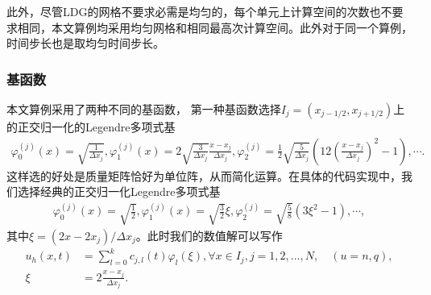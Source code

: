 此外，尽管LDG的网格不要求必需是均匀的，每个单元上计算空间的次数也不要求相同，本文算例均采用均匀网格和相同最高次计算空间。此外对于同一个算例，时间步长也是取均匀时间步长。
\subsubsection{基函数}
本文算例采用了两种不同的基函数，
第一种基函数选择$I_j = (x_{j-1/2}, x_{j+1/2})$上的正交归一化的Legendre多项式基
\begin{align*}
	\varphi_0^{(j)}(x) = \sqrt{\frac{1}{\Delta x_j}}, \varphi_1^{(j)}(x) = 2\sqrt{\frac{3}{\Delta x_j}}\frac{x-x_j}{\Delta x_j}, \varphi_2^{(j)} =\frac{1}{2}\sqrt{\frac{5}{\Delta x_j}}(12(\frac{x-x_j}{\Delta x_j})^2 - 1 ), \cdots.
\end{align*}
这样选的好处是质量矩阵恰好为单位阵，从而简化运算。在具体的代码实现中，我们选择经典的正交归一化Legendre多项式基
\begin{align*}
	\varphi_0^{(j)}(x) = \sqrt{\frac{1}{2}}, \varphi_1^{(j)}(x) = \sqrt{\frac{3}{2}}\xi, \varphi_2^{(j)} =\sqrt{\frac{5}{8}}(3\xi^2- 1 ), \cdots,
\end{align*}
其中$\xi = (2x-2x_j)/\Delta x_j$。此时我们的数值解可以写作
\begin{align*}
	u_h(x,t) & = \sum_{l=0}^k c_{j,l}(t)\varphi_{l}(\xi), \forall x \in I_j , j= 1,2,...,N, \quad (u = n,q), \\
	\xi      & = 2\frac{x-x_j}{\Delta x_j}.
\end{align*}

